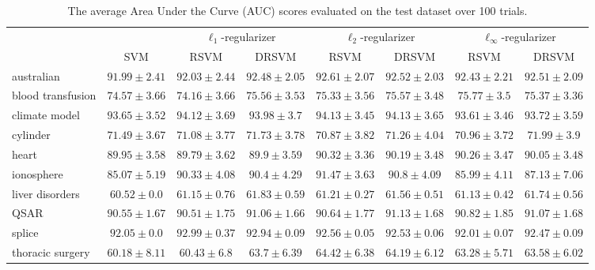\documentclass{article}
\begin{document}
\begin{table} [h] 
\centering
\caption{The average Area Under the Curve (AUC) scores
evaluated on the test dataset over 100 trials.}
\bgroup
\def\arraystretch{1.1}
\begin{tabular}{|l|c|cc|cc|cc|}
\cline{3-8}
\multicolumn{2}{c|}{} & \multicolumn{2}{c|}{$\ell_1$-regularizer} & 
\multicolumn{2}{c|}{$\ell_2$-regularizer} & \multicolumn{2}{c|}{$\ell_\infty$-regularizer} \\ 
\cline{2-8}
\multicolumn{1}{c|}{} & SVM & RSVM & DRSVM & RSVM & DRSVM & RSVM & DRSVM \\ \hline 
australian& $ 91.99 \pm 2.41 $ & $ 92.03 \pm 2.44 $ & $ 92.48 \pm 2.05 $ & $ 92.61 \pm 2.07 $ & $ 92.52 \pm 2.03 $ & $ 92.43 \pm 2.21 $ & $ 92.51 \pm 2.09 $ \\ \hline 
blood transfusion& $ 74.57 \pm 3.66 $ & $ 74.16 \pm 3.66 $ & $ 75.56 \pm 3.53 $ & $ 75.33 \pm 3.56 $ & $ 75.57 \pm 3.48 $ & $ 75.77 \pm 3.5 $ & $ 75.37 \pm 3.36 $ \\ \hline 
climate model& $ 93.65 \pm 3.52 $ & $ 94.12 \pm 3.69 $ & $ 93.98 \pm 3.7 $ & $ 94.13 \pm 3.45 $ & $ 94.13 \pm 3.65 $ & $ 93.61 \pm 3.46 $ & $ 93.72 \pm 3.59 $ \\ \hline 
cylinder& $ 71.49 \pm 3.67 $ & $ 71.08 \pm 3.77 $ & $ 71.73 \pm 3.78 $ & $ 70.87 \pm 3.82 $ & $ 71.26 \pm 4.04 $ & $ 70.96 \pm 3.72 $ & $ 71.99 \pm 3.9 $ \\ \hline 
heart& $ 89.95 \pm 3.58 $ & $ 89.79 \pm 3.62 $ & $ 89.9 \pm 3.59 $ & $ 90.32 \pm 3.36 $ & $ 90.19 \pm 3.48 $ & $ 90.26 \pm 3.47 $ & $ 90.05 \pm 3.48 $ \\ \hline 
ionosphere& $ 85.07 \pm 5.19 $ & $ 90.33 \pm 4.08 $ & $ 90.4 \pm 4.29 $ & $ 91.47 \pm 3.63 $ & $ 90.8 \pm 4.09 $ & $ 85.99 \pm 4.11 $ & $ 87.13 \pm 7.06 $ \\ \hline 
liver disorders& $ 60.52 \pm 0.0 $ & $ 61.15 \pm 0.76 $ & $ 61.83 \pm 0.59 $ & $ 61.21 \pm 0.27 $ & $ 61.56 \pm 0.51 $ & $ 61.13 \pm 0.42 $ & $ 61.74 \pm 0.56 $ \\ \hline 
QSAR& $ 90.55 \pm 1.67 $ & $ 90.51 \pm 1.75 $ & $ 91.06 \pm 1.66 $ & $ 90.64 \pm 1.77 $ & $ 91.13 \pm 1.68 $ & $ 90.82 \pm 1.85 $ & $ 91.07 \pm 1.68 $ \\ \hline 
splice& $ 92.05 \pm 0.0 $ & $ 92.99 \pm 0.37 $ & $ 92.94 \pm 0.09 $ & $ 92.56 \pm 0.05 $ & $ 92.53 \pm 0.06 $ & $ 92.01 \pm 0.07 $ & $ 92.47 \pm 0.09 $ \\ \hline 
thoracic surgery& $ 60.18 \pm 8.11 $ & $ 60.43 \pm 6.8 $ & $ 63.7 \pm 6.39 $ & $ 64.42 \pm 6.38 $ & $ 64.19 \pm 6.12 $ & $ 63.28 \pm 5.71 $ & $ 63.58 \pm 6.02 $ \\ \hline 
\end{tabular}
\egroup
\end{table}
\end{document}
